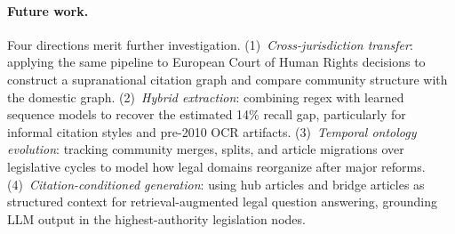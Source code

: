 \documentclass[11pt]{article}
\begin{document}
\paragraph{Future work.}
Four directions merit further investigation.
(1)~\emph{Cross-jurisdiction transfer}: applying the same pipeline to European Court of Human Rights decisions to construct a supranational citation graph and compare community structure with the domestic graph.
(2)~\emph{Hybrid extraction}: combining regex with learned sequence models to recover the estimated 14\% recall gap, particularly for informal citation styles and pre-2010 OCR artifacts.
(3)~\emph{Temporal ontology evolution}: tracking community merges, splits, and article migrations over legislative cycles to model how legal domains reorganize after major reforms.
(4)~\emph{Citation-conditioned generation}: using hub articles and bridge articles as structured context for retrieval-augmented legal question answering, grounding LLM output in the highest-authority legislation nodes.




\end{document}
